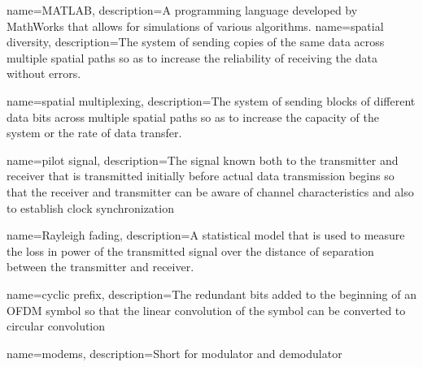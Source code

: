 {
    name=MATLAB,
    description={A programming language developed by MathWorks that allows for simulations of various algorithms.}
}
{
	name=spatial diversity,
	description={The system of sending copies of the same data across multiple spatial paths so as to increase the reliability of receiving the data without errors.}
}

{
	name=spatial multiplexing,
	description={The system of sending blocks of different data bits across multiple spatial paths so as to increase the capacity of the system or the rate of data transfer.}
}

{
	name=pilot signal,
	description={The signal known both to the transmitter and receiver that is transmitted initially before actual data transmission begins so that the receiver and transmitter can be aware of channel characteristics and also to establish clock synchronization}
}

{
	name=Rayleigh fading,
	description={A statistical model that is used to measure the loss in power of the transmitted signal over the distance of separation between the transmitter and receiver.}
}

{
	name=cyclic prefix,
	description={The redundant bits added to the beginning of an OFDM symbol so that the linear convolution of the symbol can be converted to circular convolution}
}

{
	name=modems,
	description={Short for modulator and demodulator}
}










